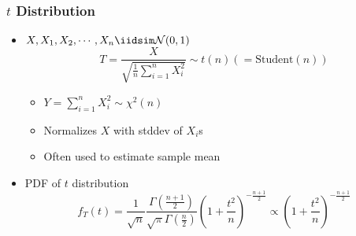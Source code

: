 \subsubsection*{$t$ Distribution}
\begin{itemize}
    \item $X,X_1,X_2,\cdots,X_n\iidsim\mathcal{N}(0,1)$
    \begin{equation}
        T=\frac{X}{\sqrt{\frac{1}{n}\sum_{i=1}^nX_i^2}}\sim t(n)(=\text{Student}(n))
    \end{equation}
    \begin{itemize}
        \item $Y=\sum_{i=1}^nX_i^2\sim\chi^2(n)$
        \item Normalizes $X$ with stddev of $X_i$s
        \item Often used to estimate sample mean
    \end{itemize}
    \item PDF of $t$ distribution
    \begin{equation}
        f_T(t)=\frac{1}{\sqrt{n}}\frac{\Gamma\left(\frac{n+1}{2}\right)}{\sqrt{\pi}\Gamma\left(\frac{n}{2}\right)}\left(1+\frac{t^2}{n}\right)^{-\frac{n+1}{2}}\varpropto\left(1+\frac{t^2}{n}\right)^{-\frac{n+1}{2}}
    \end{equation}
\end{itemize}

